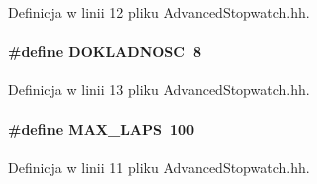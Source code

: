 Definicja w linii 12 pliku Advanced\-Stopwatch.\-hh.

\hypertarget{_advanced_stopwatch_8hh_ab44cac363b6642c6f9ba217b1d0172db}{
\paragraph[{D\-O\-K\-L\-A\-D\-N\-O\-S\-C}]{\setlength{\rightskip}{0pt plus 5cm}\#define D\-O\-K\-L\-A\-D\-N\-O\-S\-C~8}}\label{_advanced_stopwatch_8hh_ab44cac363b6642c6f9ba217b1d0172db}


Definicja w linii 13 pliku Advanced\-Stopwatch.\-hh.

\hypertarget{_advanced_stopwatch_8hh_a77588e5ce0483d6845d1f5c362111401}{
\paragraph[{M\-A\-X\-\_\-\-L\-A\-P\-S}]{\setlength{\rightskip}{0pt plus 5cm}\#define M\-A\-X\-\_\-\-L\-A\-P\-S~100}}\label{_advanced_stopwatch_8hh_a77588e5ce0483d6845d1f5c362111401}


Definicja w linii 11 pliku Advanced\-Stopwatch.\-hh.

